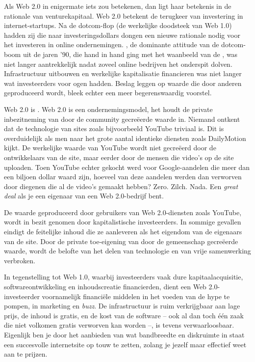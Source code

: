 {Als Web 2.0 in enigermate iets zou betekenen, dan ligt haar betekenis in
de rationale van venturekapitaal. Web 2.0 betekent de terugkeer van
investering in internet{}-startups. Na de dotcom{}-flop (de werkelijke
doodsteek van Web 1.0) hadden zij die naar investeringsdollars dongen
een nieuwe rationale nodig voor het investeren in online ondernemingen.
{\em {}}, de dominante attitude van de
dotcom{}-boom uit de jaren '90, die hand in hand ging met het waanbeeld
van de , was niet langer aantrekkelijk nadat zoveel
online bedrijven het onderspit dolven. Infrastructuur uitbouwen en
werkelijke kapitalisatie financieren was niet langer wat investeerders
voor ogen hadden. Beslag leggen op waarde die door anderen geproduceerd
wordt, bleek echter een meer begerenswaardig voorstel.

Web 2.0 is . Web 2.0 is een
ondernemingsmodel, het houdt de private inbezitneming van door de
community gecre\"eerde waarde in. Niemand ontkent dat de technologie
van sites zoals bijvoorbeeld YouTube triviaal is. Dit is overduidelijk
als men naar het grote aantal identieke diensten zoals DailyMotion
kijkt. De werkelijke waarde van YouTube wordt niet gecre\"eerd door de
ontwikkelaars van de site, maar eerder door de mensen die video's op de
site uploaden. Toen YouTube echter gekocht werd voor Google{}-aandelen
die meer dan een biljoen dollar waard zijn, hoeveel van deze aandelen
werden dan verworven door diegenen die al de video's gemaakt hebben?
Zero. Zilch. Nada. Een {\em great deal} als je een eigenaar van een
Web 2.0{}-bedrijf bent.

De waarde geproduceerd door gebruikers van Web 2.0{}-diensten zoals
YouTube, wordt in bezit genomen door kapitalistische investeerders. In
sommige gevallen eindigt de feitelijke inhoud die ze aanleveren als het
eigendom van de eigenaars van de site. Door de private toe{}-eigening
van door de gemeenschap gecre\"eerde waarde, wordt de belofte van het
delen van technologie en van vrije samenwerking verbroken.

In tegenstelling tot Web 1.0, waarbij investeerders vaak dure
kapitaalacquisitie, softwareontwikkeling en inhoudscreatie
financierden, dient een Web 2.0{}-investeerder voornamelijk
financi\"ele middelen in het voeden van de hype te pompen, in marketing
en {\em buzz}. De infrastructuur is ruim verkrijgbaar aan lage
prijs, de inhoud is gratis, en de kost van de software {--} ook al dan
toch \'e\'en zaak die niet volkomen gratis verworven kan worden {--},
is tevens verwaarloosbaar. Eigenlijk ben je door het aanbieden van wat
bandbreedte en diskruimte in staat een succesvolle internetsite op touw
te zetten, zolang je jezelf maar effectief weet aan te prijzen.

}
